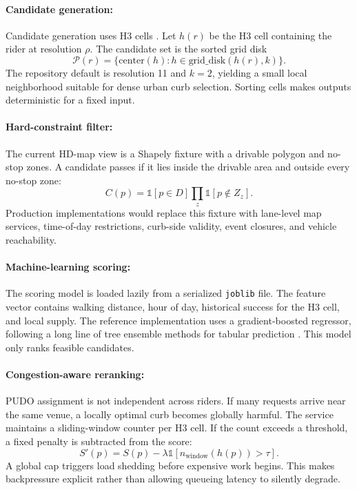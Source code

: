\documentclass{article}
\begin{document}
\paragraph{Candidate generation:}

Candidate generation uses H3 cells \citep{h3}. Let $h(r)$ be the H3 cell containing the rider at resolution $\rho$. The candidate set is the sorted grid disk
\begin{equation}
  \mathcal{P}(r)=\{ \text{center}(h) : h\in \text{grid\_disk}(h(r),k)\}.
\end{equation}
The repository default is resolution 11 and $k=2$, yielding a small local neighborhood suitable for dense urban curb selection. Sorting cells makes outputs deterministic for a fixed input.

\paragraph{Hard-constraint filter:}

The current HD-map view is a Shapely fixture with a drivable polygon and no-stop zones. A candidate passes if it lies inside the drivable area and outside every no-stop zone:
\begin{equation}
  C(p)=\mathbb{1}[p\in D]\prod_z \mathbb{1}[p\notin Z_z].
\end{equation}
Production implementations would replace this fixture with lane-level map services, time-of-day restrictions, curb-side validity, event closures, and vehicle reachability.

\paragraph{Machine-learning scoring:}

The scoring model is loaded lazily from a serialized \texttt{joblib} file. The feature vector contains walking distance, hour of day, historical success for the H3 cell, and local supply. The reference implementation uses a gradient-boosted regressor, following a long line of tree ensemble methods for tabular prediction \citep{friedman2001greedy}. This model only ranks feasible candidates.

\paragraph{Congestion-aware reranking:}

PUDO assignment is not independent across riders. If many requests arrive near the same venue, a locally optimal curb becomes globally harmful. The service maintains a sliding-window counter per H3 cell. If the count exceeds a threshold, a fixed penalty is subtracted from the score:
\begin{equation}
  S'(p)=S(p)-\lambda\mathbb{1}[n_{\text{window}}(h(p))>\tau].
\end{equation}
A global cap triggers load shedding before expensive work begins. This makes backpressure explicit rather than allowing queueing latency to silently degrade.
\end{document}
